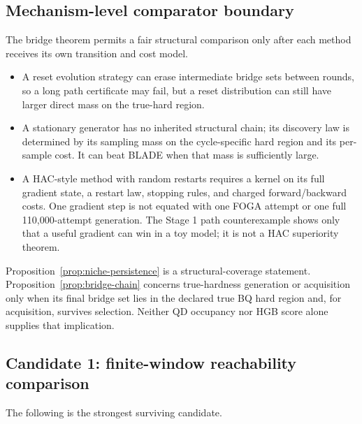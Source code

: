 \subsection{Mechanism-level comparator boundary}
  
The bridge theorem permits a fair structural comparison only after each
method receives its own transition and cost model.

\begin{itemize}
\item A reset evolution strategy can erase intermediate bridge sets between
rounds, so a long path certificate may fail, but a reset distribution can
still have larger direct mass on the true-hard region.
\item A stationary generator has no inherited structural chain; its discovery
law is determined by its sampling mass on the cycle-specific hard region and
its per-sample cost. It can beat BLADE when that mass is sufficiently large.
\item A HAC-style method with random restarts requires a kernel on its full
gradient state, a restart law, stopping rules, and charged forward/backward
costs. One gradient step is not equated with one FOGA attempt or one full
110,000-attempt generation. The Stage 1 path counterexample shows only that a
useful gradient can win in a toy model; it is not a HAC superiority theorem.
\end{itemize}

Proposition~\ref{prop:niche-persistence} is a structural-coverage statement.
Proposition~\ref{prop:bridge-chain} concerns true-hardness generation or
acquisition only when its final bridge set lies in the declared true BQ hard
region and, for acquisition, survives selection. Neither QD occupancy nor HGB
score alone supplies that implication.

\subsection{Candidate 1: finite-window reachability comparison}
   The following
is the strongest surviving candidate.

